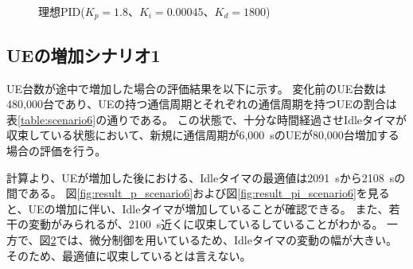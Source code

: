 \documentclass[a4j]{ujarticle}
\begin{document}
\begin{figure}[htbp]
\begin{subfigure}{0.49\hsize}
   \label{subfig:scenario_6_stateBreakdown_86400_345600_1-8_0-00045_1800_0_ideal}
 \end{subfigure}
 \caption{理想PID($K_p = 1.8、K_i = 0.00045、K_d = 1800$)}
 \label{fig:result_pid_scenario6}
\end{figure}



\clearpage
\subsection{UEの増加シナリオ1}
UE台数が途中で増加した場合の評価結果を以下に示す。
変化前のUE台数は480,000台であり、UEの持つ通信周期とそれぞれの通信周期を持つUEの割合は表\ref{table:scenario6}の通りである。
この状態で、十分な時間経過させIdleタイマが収束している状態において、新規に通信周期が6,000~sのUEが80,000台増加する場合の評価を行う。

計算より、UEが増加した後における、Idleタイマの最適値は2091~sから2108~sの間である。
図\ref{fig:result_p_scenario6}および図\ref{fig:result_pi_scenario6}を見ると、UEの増加に伴い、Idleタイマが増加していることが確認できる。
また、若干の変動がみられるが、2100~s近くに収束しているしていることがわかる。
一方で、図\ref{fig:result_pid_scenario6}では、微分制御を用いているため、Idleタイマの変動の幅が大きい。
そのため、最適値に収束しているとは言えない。
\end{document}
